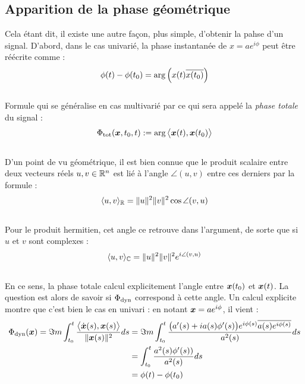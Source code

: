 \subsection{Apparition de la phase géométrique}\label{subsec:intro_phaseg}

Cela étant dit, il existe une autre façon, plus simple, d'obtenir la pahse d'un signal. D'abord, dans le cas univarié, la phase instantanée de $x=ae^{i\phi}$ peut être réécrite comme :
\[\phi(t)-\phi(t_0)  = \arg\left( x(t) \overline{x(t_0)} \right)\]
\\
Formule qui se généralise en cas multivarié par ce qui sera appelé la \emph{phase totale} du signal :
\begin{equation}\label{eq:phase_t}
	\Phi_{\text{\normalfont tot}}(\boldsymbol{x}, t_0, t) := \arg\big\langle \boldsymbol{x}(t), \boldsymbol{x}(t_0)\big\rangle
\end{equation}
\\
D'un point de vu géométrique, il est bien connue que le produit scalaire entre deux vecteurs réels $u,v\in\mathbb{R}^n$ est lié à l'angle $\angle(u,v)$ entre ces derniers par la formule :
\[\langle u,v\rangle_{\mathbb{R}} = \|u\|^2 \|v\|^2 \cos \angle(v,u)\]
\\
Pour le produit hermitien, cet angle ce retrouve dans l'argument, de sorte que si $u$ et $v$ sont complexes :
\[\langle u,v\rangle_{\mathbb{C}} = \|u\|^2 \|v\|^2 e^{i \angle(v,u)}\]
\\
En ce sens, la phase totale calcul explicitement l'angle entre $\boldsymbol{x}(t_0)$ et $\boldsymbol{x}(t)$. La question est alors de savoir si $\Phi_{\text{\normalfont dyn}}$ correspond à cette angle. 
Un calcul explicite montre que c'est bien le cas en univari : en notant $\boldsymbol{x} = ae^{i\phi}$, il vient  :
\begin{align*}
	\Phi_{\text{\normalfont dyn}}(\boldsymbol{x}) = \Im m\int_{t_0}^t \frac{\big\langle \dot{\boldsymbol{x}}(s) , \boldsymbol{x}(s) \big\rangle}{\|\boldsymbol{x}(s)\|^2} ds &= \Im m \int_{t_0}^t \frac{\big(a'(s) + ia(s)\phi'(s) \big) e^{i\phi(s)} \overline{a(s) e^{i\phi(s)}}}{a^2(s)} ds \\
	&= \int_{t_0}^t \frac{a^2(s)\phi'(s))}{a^2(s)} ds \\
	&= \phi(t) - \phi(t_0)
\end{align*}
\skipl

